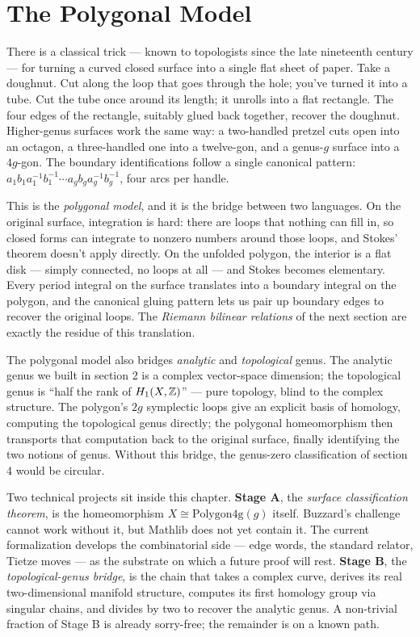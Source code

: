 \section{The Polygonal Model}
\label{sec:polygonal-model}

\begin{layman}
There is a classical trick --- known to topologists since the late
nineteenth century --- for turning a curved closed surface into a
single flat sheet of paper. Take a doughnut. Cut along the loop
that goes through the hole; you've turned it into a tube. Cut the
tube once around its length; it unrolls into a flat rectangle.
The four edges of the rectangle, suitably glued back together,
recover the doughnut. Higher-genus surfaces work the same way: a
two-handled pretzel cuts open into an octagon, a three-handled one
into a twelve-gon, and a genus-\(g\) surface into a \(4g\)-gon.
The boundary identifications follow a single canonical pattern:
\(a_1 b_1 a_1^{-1} b_1^{-1} \cdots a_g b_g a_g^{-1} b_g^{-1}\),
four arcs per handle.

This is the \emph{polygonal model}, and it is the bridge between
two languages. On the original surface, integration is hard: there
are loops that nothing can fill in, so closed forms can integrate
to nonzero numbers around those loops, and Stokes' theorem doesn't
apply directly. On the unfolded polygon, the interior is a flat
disk --- simply connected, no loops at all --- and Stokes becomes
elementary. Every period integral on the surface translates into a
boundary integral on the polygon, and the canonical gluing pattern
lets us pair up boundary edges to recover the original loops.
The \emph{Riemann bilinear relations} of the next section are
exactly the residue of this translation.

The polygonal model also bridges \emph{analytic} and
\emph{topological} genus. The analytic genus we built in section
2 is a complex vector-space dimension; the topological genus is
``half the rank of \(H_1(X,\mathbb{Z})\)'' --- pure topology, blind to the
complex structure. The polygon's \(2g\) symplectic loops give an
explicit basis of homology, computing the topological genus
directly; the polygonal homeomorphism then transports that
computation back to the original surface, finally identifying the
two notions of genus. Without this bridge, the genus-zero
classification of section 4 would be circular.

Two technical projects sit inside this chapter. \textbf{Stage A},
the \emph{surface classification theorem}, is the homeomorphism
\(X \cong \mathrm{Polygon4g}(g)\) itself. Buzzard's challenge cannot
work without it, but Mathlib does not yet contain it. The current
formalization develops the combinatorial side --- edge words, the
standard relator, Tietze moves --- as the substrate on which a future
proof will rest. \textbf{Stage B}, the \emph{topological-genus
bridge}, is the chain that takes a complex curve, derives its real
two-dimensional manifold structure, computes its first homology
group via singular chains, and divides by two to recover the
analytic genus. A non-trivial fraction of Stage B is already
sorry-free; the remainder is on a known path.
\end{layman}

